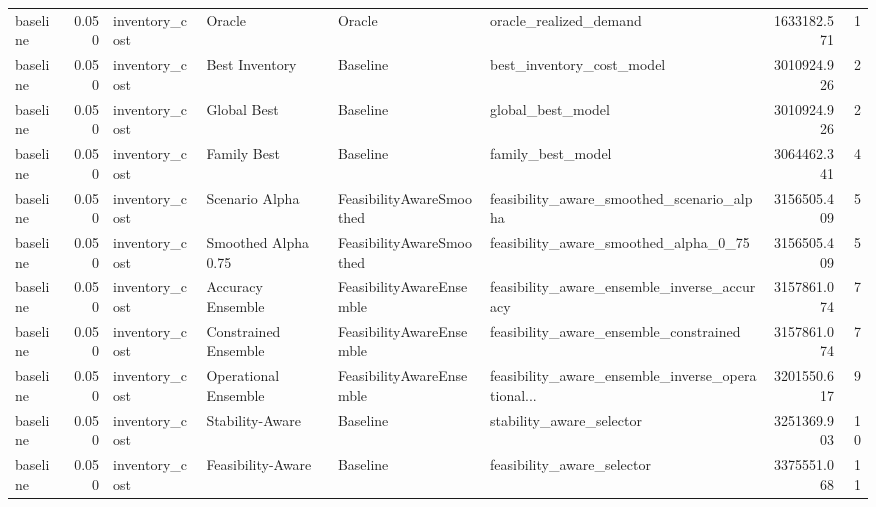 \begin{table}
{\begin{tabular}{lrllllrr}
      baseline &             0.050 &              inventory\_cost &                Oracle &                    Oracle &                             oracle\_realized\_demand &   1633182.571 &               1 \\
      baseline &             0.050 &              inventory\_cost &        Best Inventory &                  Baseline &                          best\_inventory\_cost\_model &   3010924.926 &               2 \\
      baseline &             0.050 &              inventory\_cost &           Global Best &                  Baseline &                                  global\_best\_model &   3010924.926 &               2 \\
      baseline &             0.050 &              inventory\_cost &           Family Best &                  Baseline &                                  family\_best\_model &   3064462.341 &               4 \\
      baseline &             0.050 &              inventory\_cost &        Scenario Alpha &  FeasibilityAwareSmoothed &          feasibility\_aware\_smoothed\_scenario\_alpha &   3156505.409 &               5 \\
      baseline &             0.050 &              inventory\_cost &   Smoothed Alpha 0.75 &  FeasibilityAwareSmoothed &              feasibility\_aware\_smoothed\_alpha\_0\_75 &   3156505.409 &               5 \\
      baseline &             0.050 &              inventory\_cost &     Accuracy Ensemble &  FeasibilityAwareEnsemble &        feasibility\_aware\_ensemble\_inverse\_accuracy &   3157861.074 &               7 \\
      baseline &             0.050 &              inventory\_cost &  Constrained Ensemble &  FeasibilityAwareEnsemble &             feasibility\_aware\_ensemble\_constrained &   3157861.074 &               7 \\
      baseline &             0.050 &              inventory\_cost &  Operational Ensemble &  FeasibilityAwareEnsemble &  feasibility\_aware\_ensemble\_inverse\_operational... &   3201550.617 &               9 \\
      baseline &             0.050 &              inventory\_cost &       Stability-Aware &                  Baseline &                           stability\_aware\_selector &   3251369.903 &              10 \\
      baseline &             0.050 &              inventory\_cost &     Feasibility-Aware &                  Baseline &                         feasibility\_aware\_selector &   3375551.068 &              11 \\

\end{tabular}}
\end{table}
